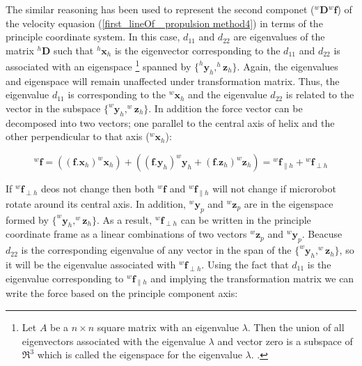 \documentclass[12pt,a4paper,titlepage]{report}
\begin{document}
The similar reasoning has been used to represent the second componet (${^{w}\bm{D}} {^{w}\bm{f}}$) of 
the velocity equasion (\ref{first_lineOf_ propulsion method4}) in terms of the
principle coordinate system. In this case, $d_{11}$ and $d_{22}$ are eigenvalues of the matrix $^{h}\bm{D}$ 
such that $^{h}\bm{x}_h$ is the eigenvector corresponding to the $d_{11}$ and $d_{22}$ is associated with
an eigenspace \footnote{Let $A $ be a $n \times n$ square matrix with an 
eigenvalue $\lambda$. Then the union of all eigenvectors associated with the eigenvalue $\lambda $ and
vector zero is a subspace of $\Re ^{3}$ which is called the eigenspace for the eigenvalue $\lambda$.
\citep{Doe:2014Aug:Online}.} spanned by $\{ ^{h}\bm{y}_{h} , ^{h}\bm{z}_{h} \}$. Again, the eigenvalues and
eigenspace will remain unaffected under transformation matrix. Thus, the eigenvalue $d_{11}$ is corresponding 
to the $^{w}\bm{x}_h$ and the eigenvalue $d_{22}$ is related to the vector in the 
subspace $\{ ^{w}\bm{y}_h ,   ^{w}\bm{z}_h  \}$. In addition the force vector can be decomposed into two  
vectors; one parallel to the central axis of helix and the other perpendicular to that axis ($^{w}\bm{x}_h$):



\begin{equation}
{^{w}\bm{f}} = \left ( (\bm{f} . \bm{x}_h) ^{w}\bm{x}_h \right) +  \left ( (\bm{f} . \bm{y}_h) ^{w}\bm{y}_h
 +  (\bm{f} . \bm{z}_h) ^{w}\bm{z}_h \right) = {^{w}\bm{f}}_{\parallel h} + {^{w}\bm{f}}_{\perp h}
\label{f_Component_globalAxis}
\end{equation}

If ${^{w}\bm{f}}_{\perp h}$ deos not change then both ${^{w}\bm{f}}$ and ${^{w}\bm{f}}_{\parallel h}$ will 
not change if microrobot rotate around its central axis. In addition, $^{w}\bm{y}_p$ and $^{w}\bm{z}_p$ are 
in the eigenspace formed by $\{ ^{w}\bm{y}_h ,   ^{w}\bm{z}_h  \}$. As a result, ${^{w}\bm{f}}_{\perp h}$ can be written in the 
principle coordinate frame as a linear combinations of two vectors ${^{w}\bm{z}}_{p}$ and 
${^{w}\bm{y}}_{p}$. Beacuse $d_{22}$ is the corresponding eigenvalue of any vector in the span of the
 $\{ ^{w}\bm{y}_h , ^{w}\bm{z}_h  \}$, so it will be the eigenvalue associated with ${^{w}\bm{f}}_{\perp h}$.
Using the fact that $d_{11}$ is the eigenvalue corresponding to $ {^{w}\bm{f}}_{\parallel h} $ and implying 
the transformation matrix we can write the force based on the principle component axis:
   
\end{document}
